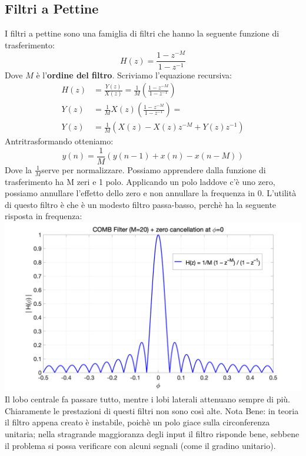 \subsection{Filtri a Pettine}
I filtri a pettine sono una famiglia di filtri che hanno la seguente funzione di trasferimento:
\begin{equation}
    H(z) = \frac{1 - z^{-M}}{1 - z^{-1}}
\end{equation}
Dove $M$ è l'\textbf{ordine del filtro}. Scriviamo l'equazione recursiva:
\begin{align*}
    H(z) &= \frac{Y(z)}{X(z)} = \frac{1}{M} \left(\frac{1 - z^{-M}}{1 - z^{-1}}\right)\\
         Y(z) &= \frac{1}{M}X(z)\left(\frac{1 - z^{-M}}{1 - z^{-1}}\right) =\\
         Y(z) &= \frac{1}{M}\left(X(z) - X(z)z^{-M} + Y(z)z^{-1}\right) 
\end{align*}
Antritrasformando otteniamo:
\begin{equation}
    y(n) = \frac{1}{M}\left(y(n-1) + x(n) - x(n - M)\right)
\end{equation}
Dove la $\frac{1}{M} $serve per normalizzare. Possiamo apprendere dalla funzione di trasferimento ha M zeri e 1 polo.
Applicando un polo laddove c'è uno zero, possiamo annullare l'effetto dello zero e non annullare la frequenza in 0.
L'utilità di questo filtro è che è un modesto filtro passa-basso, perchè ha la seguente risposta in frequenza:\\
\includegraphics[width=15cm]{src/Comb20Filter.png}
Il lobo centrale fa passare tutto, mentre i lobi laterali attenuano sempre di più. Chiaramente le prestazioni
di questi filtri non sono così alte. Nota Bene: in teoria il filtro appena creato è instabile, poichè un polo
giace sulla circonferenza unitaria; nella stragrande maggioranza degli input il filtro risponde bene, sebbene
il problema si possa verificare con alcuni segnali (come il gradino unitario).

